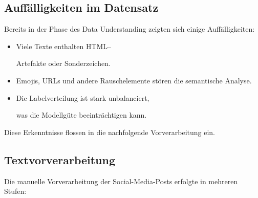 \subsection{Auffälligkeiten im Datensatz}

Bereits in der Phase des Data Understanding zeigten sich einige Auffälligkeiten:
\begin{itemize}
    \item Viele Texte enthalten HTML–
    
    Artefakte oder Sonderzeichen.
    \item Emojis, URLs und andere Rauschelemente stören die semantische Analyse.
    \item Die Labelverteilung ist stark unbalanciert,
    
    was die Modellgüte beeinträchtigen kann.
\end{itemize}
Diese Erkenntnisse flossen in die nachfolgende Vorverarbeitung ein.

\newpage

\subsection{Textvorverarbeitung}
Die manuelle Vorverarbeitung der Social-Media-Posts erfolgte in mehreren Stufen:

